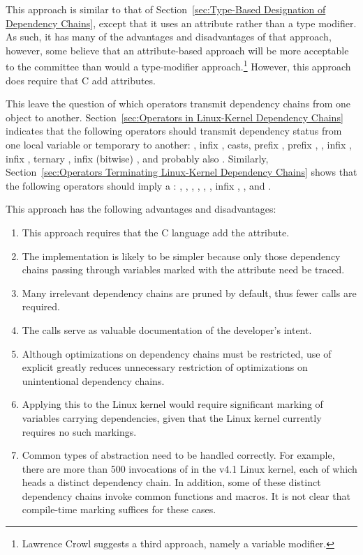 \documentclass[letterpaper,twocolumn,10pt]{article}
\begin{document}
This approach is similar to that of
Section~\ref{sec:Type-Based Designation of Dependency Chains},
except that it uses an attribute rather than a type modifier.
As such, it has many of the advantages and disadvantages of that
approach, however, some believe that an attribute-based approach
will be more acceptable to the committee than would a type-modifier
approach.\footnote{
	Lawrence Crowl suggests a third approach, namely a variable
	modifier.}
However, this approach does require that C add attributes.

This leave the question of which operators transmit dependency
chains from one  object to another.
Section~\ref{sec:Operators in Linux-Kernel Dependency Chains}
indicates that
the following operators should transmit dependency status from
one local variable or temporary to another:
\co{->}, infix \co{=}, casts, prefix \co{&}, prefix \co{*}, \co{[]},
infix \co{+}, infix \co{-}, ternary , infix (bitwise) \co{&},
and probably also \co{|}.
Similarly,
Section~\ref{sec:Operators Terminating Linux-Kernel Dependency Chains}
shows that the following operators should imply a
:
\co{()}, \co{!}, \co{==}, \co{!=}, \co{&&}, \co{||}, infix \co{*}, \co{/},
and \co{\%}.

This approach has the following advantages and disadvantages:

\begin{enumerate}
\item	This approach requires that the C language add the
	 attribute.
\item	The implementation is likely to be simpler because only those
	dependency chains passing through variables marked with the
	 attribute need be traced.
\item	Many irrelevant dependency chains are pruned by default, thus
	fewer  calls are required.
\item	The  calls serve as valuable documentation
	of the developer's intent.
\item	Although optimizations on dependency chains must be restricted,
	use of explicit  greatly reduces
	unnecessary restriction of optimizations on unintentional
	dependency chains.
\item	Applying this to the Linux kernel would require significant
	marking of variables carrying dependencies, given that the
	Linux kernel currently requires no such markings.
\item	Common types of abstraction need to be handled correctly.
	For example, there are more than 500 invocations of
	 in the v4.1 Linux kernel,
	each of which heads a distinct dependency chain.
	In addition, some of these distinct dependency chains invoke
	common functions and macros.
	It is not clear that compile-time marking suffices for these
	cases.
\end{enumerate}
\end{document}
